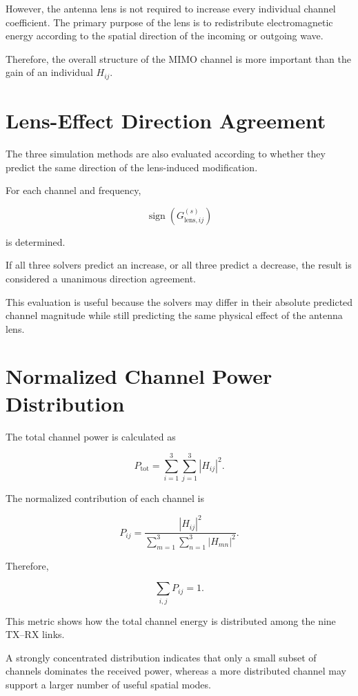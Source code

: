 \documentclass[11pt,a4paper]{article}
\begin{document}
However, the antenna lens is not required to increase every individual channel coefficient. The primary purpose of the lens is to redistribute electromagnetic energy according to the spatial direction of the incoming or outgoing wave.

Therefore, the overall structure of the MIMO channel is more important than the gain of an individual $H_{ij}$.

\section{Lens-Effect Direction Agreement}

The three simulation methods are also evaluated according to whether they predict the same direction of the lens-induced modification.

For each channel and frequency,

\[
\operatorname{sign}
\left(
G_{\mathrm{lens},ij}^{(s)}
\right)
\]

is determined.

If all three solvers predict an increase, or all three predict a decrease, the result is considered a unanimous direction agreement.

This evaluation is useful because the solvers may differ in their absolute predicted channel magnitude while still predicting the same physical effect of the antenna lens.

\section{Normalized Channel Power Distribution}

The total channel power is calculated as

\[
P_{\mathrm{tot}}
=
\sum_{i=1}^{3}
\sum_{j=1}^{3}
|H_{ij}|^2.
\]

The normalized contribution of each channel is

\[
P_{ij}
=
\frac{|H_{ij}|^2}
{\displaystyle
\sum_{m=1}^{3}
\sum_{n=1}^{3}
|H_{mn}|^2}.
\]

Therefore,

\[
\sum_{i,j}P_{ij}=1.
\]

This metric shows how the total channel energy is distributed among the nine TX--RX links.

A strongly concentrated distribution indicates that only a small subset of channels dominates the received power, whereas a more distributed channel may support a larger number of useful spatial modes.
\end{document}
